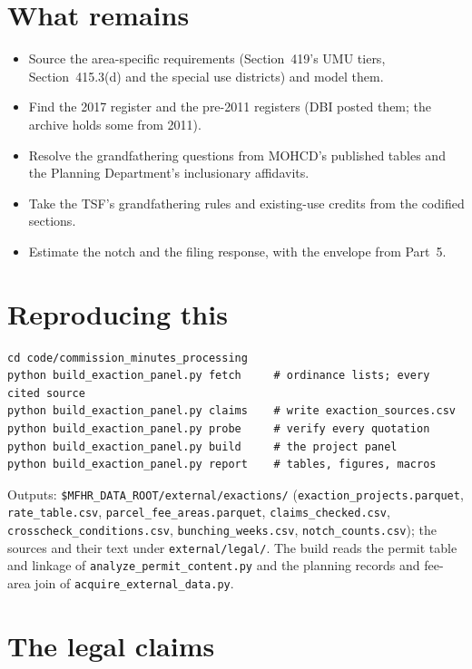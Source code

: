 \documentclass[11pt]{article}
\newcommand{\extable}[1]{\FloatBarrier\def\extab{#1}}
\begin{document}
\section{What remains}\label{sec:exremains}

\begin{itemize}
\item Source the area-specific requirements (Section~419's UMU tiers, Section~415.3(d) and the
special use districts) and model them.
\item Find the 2017 register and the pre-2011 registers (DBI posted them; the archive holds some
from 2011).
\item Resolve the grandfathering questions from MOHCD's published tables and the Planning
Department's inclusionary affidavits.
\item Take the TSF's grandfathering rules and existing-use credits from the codified sections.
\item Estimate the notch and the filing response, with the envelope from Part~5.
\end{itemize}

\section{Reproducing this}\label{sec:exrepro}

\begin{verbatim}
cd code/commission_minutes_processing
python build_exaction_panel.py fetch     # ordinance lists; every cited source
python build_exaction_panel.py claims    # write exaction_sources.csv
python build_exaction_panel.py probe     # verify every quotation
python build_exaction_panel.py build     # the project panel
python build_exaction_panel.py report    # tables, figures, macros
\end{verbatim}
Outputs: \texttt{\$MFHR\_DATA\_ROOT/external/exactions/} (\texttt{exaction\_projects.parquet},
\texttt{rate\_table.csv}, \texttt{parcel\_fee\_areas.parquet}, \texttt{claims\_checked.csv},
\texttt{crosscheck\_conditions.csv}, \texttt{bunching\_weeks.csv}, \texttt{notch\_counts.csv});
the sources and their text under \texttt{external/legal/}. The build reads the permit table and
linkage of \texttt{analyze\_permit\_content.py} and the planning records and fee-area join of
\texttt{acquire\_external\_data.py}.

\clearpage
\appendix
\section{The legal claims}\label{sec:exclaims}
\extable{exclaims}
\end{document}
